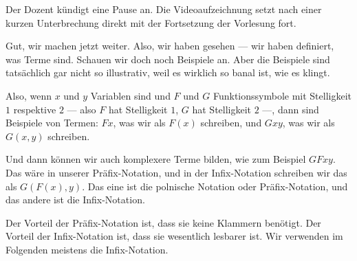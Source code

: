 \begin{math-stroke}
\end{math-stroke}

\begin{lecture-break}
Der Dozent kündigt eine Pause an. Die Videoaufzeichnung setzt nach einer kurzen Unterbrechung direkt mit der Fortsetzung der Vorlesung fort.
\end{lecture-break}

\begin{ai-global-state-checkpoint-invisible-content}
\end{ai-global-state-checkpoint-invisible-content}

\begin{spoken-clean}[00:48:52 - 00:50:52]
Gut, wir machen jetzt weiter. Also, wir haben gesehen --- wir haben definiert, was Terme sind. Schauen wir doch noch Beispiele an. Aber die Beispiele sind tatsächlich gar nicht so illustrativ, weil es wirklich so banal ist, wie es klingt.

Also, wenn $x$ und $y$ Variablen sind und $F$ und $G$ Funktionssymbole mit Stelligkeit $1$ respektive $2$ --- also $F$ hat Stelligkeit $1$, $G$ hat Stelligkeit $2$ ---, dann sind Beispiele von Termen: $Fx$, was wir als $F(x)$ schreiben, und $Gxy$, was wir als $G(x, y)$ schreiben.
\end{spoken-clean}

\begin{spoken-clean}[00:50:52 - 00:52:52]
Und dann können wir auch komplexere Terme bilden, wie zum Beispiel $GFxy$. Das wäre in unserer Präfix-Notation, und in der Infix-Notation schreiben wir das als $G(F(x), y)$. Das eine ist die polnische Notation oder Präfix-Notation, und das andere ist die Infix-Notation.

Der Vorteil der Präfix-Notation ist, dass sie keine Klammern benötigt. Der Vorteil der Infix-Notation ist, dass sie wesentlich lesbarer ist. Wir verwenden im Folgenden meistens die Infix-Notation.
\end{spoken-clean}

